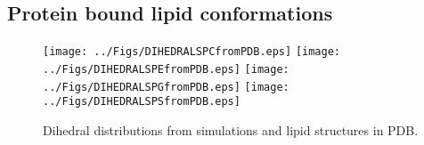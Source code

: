 \documentclass[aps,prl,superscriptaddress,twocolumn]{revtex4}
\begin{document}







\subsection{Protein bound lipid conformations }
\begin{figure*}[!h]
  \centering
  \texttt{[image: ../Figs/DIHEDRALSPCfromPDB.eps]}
  \texttt{[image: ../Figs/DIHEDRALSPEfromPDB.eps]}
  \texttt{[image: ../Figs/DIHEDRALSPGfromPDB.eps]}
  \texttt{[image: ../Figs/DIHEDRALSPSfromPDB.eps]}
  \caption{\label{structures}
    Dihedral distributions from simulations and lipid structures in PDB.
  }
\end{figure*}
\end{document}

